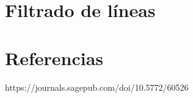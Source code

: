 \documentclass[12pt, a4paper]{article}
\begin{document}
\section{Filtrado de líneas}



\section{Referencias}

https://journals.sagepub.com/doi/10.5772/60526

\end{document}
